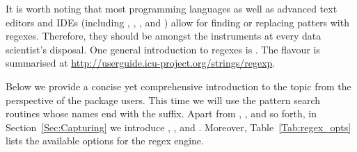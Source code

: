 \documentclass[nojss]{jss}\usepackage[]{graphicx}\usepackage[]{color}
\begin{document}
It is worth noting that most programming languages
as well as advanced text editors and IDEs (including
, , , and )
allow for finding or replacing patters with regexes.
Therefore, they should be amongst the instruments
at every data scientist's disposal.
One general introduction to regexes is \citep{friedl}.
The  flavour is summarised at
\url{http://userguide.icu-project.org/strings/regexp}.






Below we provide a concise yet comprehensive introduction
to the topic from the perspective of the  package users.
This time we will use the pattern search routines whose names
end with the  suffix.
Apart from , ,
and so forth, in Section~\ref{Sec:Capturing} we introduce
,
, and
.
Moreover, Table~\ref{Tab:regex_opts} lists the available options
for the regex engine.


\end{document}
